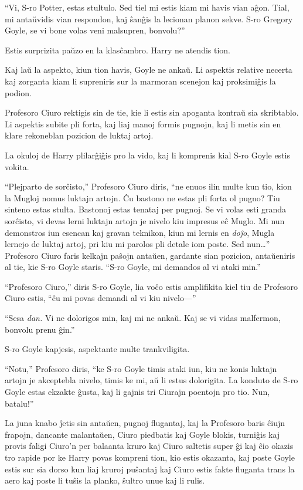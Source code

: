 ``Vi, S-ro Potter, estas stultulo. Sed tiel mi estis kiam mi havis
vian aĝon. Tial, mi antaŭvidis vian respondon, kaj ŝanĝis la lecionan
planon sekve. S-ro Gregory Goyle, se vi bone volas veni malsupren,
bonvolu?''

Estis surprizita paŭzo en la klasĉambro. Harry ne atendis tion.

Kaj laŭ la aspekto, kiun tion havis, Goyle ne ankaŭ. Li aspektis
relative necerta kaj zorganta kiam li supreniris sur la marmoran
scenejon kaj proksimiĝis la podion.

Profesoro Ciuro rektigis sin de tie, kie li estis sin apoganta kontraŭ sia
skribtablo. Li aspektis subite pli forta, kaj liaj manoj formis
pugnojn, kaj li metis sin en klare rekoneblan pozicion de luktaj
artoj.

La okuloj de Harry plilarĝiĝis pro la vido, kaj li komprenis kial S-ro
Goyle estis vokita.

``Plejparto de sorĉisto,'' Profesoro Ciuro diris, ``ne enuos ilin
multe kun tio, kion la Mugloj nomus luktajn artojn. Ĉu bastono ne
estas pli forta ol pugno? Tiu sinteno estas stulta. Bastonoj estas
tenataj per pugnoj. Se vi volas esti granda sorĉisto, vi devas lerni
luktajn artojn je nivelo kiu impresus eĉ Muglo.  Mi nun demonstros iun
esencan kaj gravan teknikon, kiun mi lernis en \emph{doĵo}, Mugla
lernejo de luktaj artoj, pri kiu mi parolos pli detale iom poste. Sed
nun\ldots'' Profesoro Ciuro faris kelkajn paŝojn antaŭen, gardante
sian pozicion, antaŭeniris al tie, kie S-ro Goyle staris. ``S-ro
Goyle, mi demandos al vi ataki min.''

``Profesoro Ciuro,'' diris S-ro Goyle, lia voĉo estis amplifikita kiel
tiu de Profesoro Ciuro estis, ``ĉu mi povas demandi al vi kiu
nivelo—'' 

``Sesa \emph{dan.} Vi ne dolorigos min, kaj mi ne ankaŭ. Kaj se vi
vidas malfermon, bonvolu prenu ĝin.''

S-ro Goyle kapjesis, aspektante multe trankviligita.

``Notu,'' Profesoro diris, ``ke S-ro Goyle timis ataki iun, kiu ne
konis luktajn artojn je akceptebla nivelo, timis ke mi, aŭ li estus
dolorigita. La konduto de S-ro Goyle estas ekzakte ĝusta, kaj li
gajnis tri Ciurajn poentojn pro tio. Nun, batalu!''

La juna knabo ĵetis sin antaŭen, pugnoj flugantaj, kaj la Profesoro
baris ĉiujn frapojn, dancante malantaŭen, Ciuro piedbatis kaj Goyle
blokis, turniĝis kaj provis faligi Ciuro'n per balaanta kruro kaj
Ciuro saltetis super ĝi kaj ĉio okazis tro rapide por ke Harry povas
kompreni tion, kio estis okazanta, kaj poste Goyle estis sur sia dorso
kun liaj kruroj puŝantaj kaj Ciuro estis fakte fluganta trans la aero
kaj poste li tuŝis la planko, ŝultro unue kaj li rulis.

